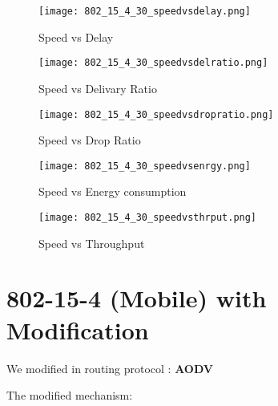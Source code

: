 \documentclass{report}
\begin{document}
\begin{figure}
  \caption{Speed vs Delay}
  \centering
    \texttt{[image: 802\_15\_4\_30\_speedvsdelay.png]}
\end{figure}
\begin{figure}
  \caption{Speed vs Delivary Ratio}
  \centering
    \texttt{[image: 802\_15\_4\_30\_speedvsdelratio.png]}
\end{figure}
\begin{figure}
  \caption{Speed vs Drop Ratio}
  \centering
    \texttt{[image: 802\_15\_4\_30\_speedvsdropratio.png]}
\end{figure}
\begin{figure}
  \caption{Speed vs Energy consumption}
  \centering
    \texttt{[image: 802\_15\_4\_30\_speedvsenrgy.png]}
\end{figure}
\begin{figure}
  \caption{Speed vs Throughput}
  \centering
    \texttt{[image: 802\_15\_4\_30\_speedvsthrput.png]}
\end{figure}

\chapter{802-15-4 (Mobile) with Modification}

We modified in routing protocol : \textbf{AODV}

The modified mechanism: 
\end{document}
